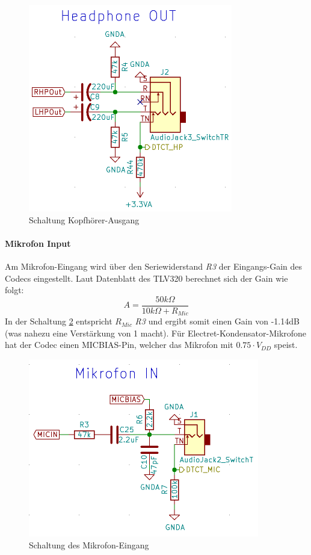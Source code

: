 \begin{figure} [H]
\begin{center}
 \includegraphics[scale=0.5]{../graphics/Schema_HPOUT.png}
 \caption{Schaltung Kopfhörer-Ausgang}
\label{fig:Schema_HPOUT}
\end{center}
\end{figure}


\paragraph{Mikrofon Input}
\label{par:MicIN}
Am Mikrofon-Eingang wird über den Seriewiderstand \textit{R3} der Eingangs-Gain des Codecs eingestellt. Laut Datenblatt des TLV320 \cite{tlv320} berechnet sich der Gain wie folgt:
\begin{equation}
A=\frac{50k\Omega}{10k\Omega+R_{Mic}}
\end{equation}
In der Schaltung \ref{fig:Schema_MicIN} entspricht $R_{Mic}$ \textit{R3} und ergibt somit einen Gain von -1.14dB (was nahezu eine Verstärkung von 1 macht).
Für Electret-Kondensator-Mikrofone hat der Codec einen MICBIAS-Pin, welcher das Mikrofon mit $0.75\cdot V_{DD}$ speist.
\begin{figure} [H]
\begin{center}
\includegraphics[scale=0.5]{../graphics/Schema_MicIN.png}
\caption{Schaltung des Mikrofon-Eingang}
\label{fig:Schema_MicIN}
\end{center}
\end{figure}


